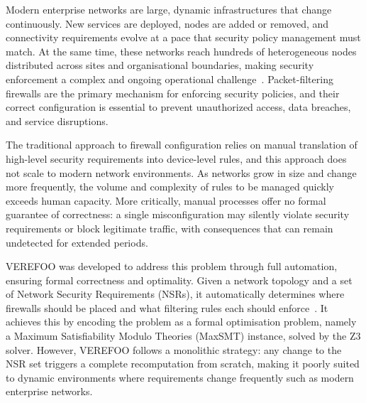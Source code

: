 



Modern enterprise networks are large, dynamic infrastructures that change continuously. New services are deployed, nodes are added or removed, and connectivity requirements evolve at a pace that security policy management must match. At the same time, these networks reach hundreds of heterogeneous nodes distributed across sites and organisational boundaries, making security enforcement a complex and ongoing operational challenge~\cite{automation-survey}. Packet-filtering firewalls are the primary mechanism for enforcing security policies, and their correct configuration is essential to prevent unauthorized access, data breaches, and service disruptions.

The traditional approach to firewall configuration relies on manual translation of high-level security requirements into device-level rules, and this approach does not scale to modern network environments. As networks grow in size and change more frequently, the volume and complexity of rules to be managed quickly exceeds human capacity. More critically, manual processes offer no formal guarantee of correctness: a single misconfiguration may silently violate security requirements or block legitimate traffic, with consequences that can remain undetected for extended periods. 

VEREFOO was developed to address this problem through full automation, ensuring formal correctness and optimality. Given a network topology and a set of Network Security Requirements (NSRs), it automatically determines where firewalls should be placed and what filtering rules each should enforce~\cite{verefoo}. It achieves this by encoding the problem as a formal optimisation problem, namely a Maximum Satisfiability Modulo Theories (MaxSMT) instance, solved by the Z3 solver. However, VEREFOO follows a monolithic strategy: any change to the NSR set triggers a complete recomputation from scratch, making it poorly suited to dynamic environments where requirements change frequently such as modern enterprise networks.

